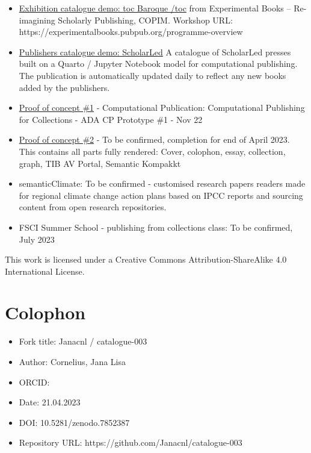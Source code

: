 \documentclass[
  letterpaper,
]{book}
\providecommand{\tightlist}{%
  \setlength{\itemsep}{0pt}\setlength{\parskip}{0pt}}\usepackage{longtable,booktabs,array}
\begin{document}
\begin{itemize}
\item
  \href{https://nfdi4culture.github.io/experimental-books-workshop/}{Exhibition
  catalogue demo: toc Baroque /toc} from Experimental Books --
  Re-imagining Scholarly Publishing, COPIM. Workshop URL:
  https://experimentalbooks.pubpub.org/programme-overview
\item
  \href{https://simonxix.github.io/scholarled_catalogue/}{Publishers
  catalogue demo: ScholarLed} A catalogue of ScholarLed presses built on
  a Quarto / Jupyter Notebook model for computational publishing. The
  publication is automatically updated daily to reflect any new books
  added by the publishers.
\item
  \href{https://nfdi4culture.github.io/cp4c/}{Proof of concept \#1} -
  Computational Publication: Computational Publishing for Collections -
  ADA CP Prototype \#1 - Nov 22
\item
  \href{https://nfdi4culture.github.io/art_catalogue_test/}{Proof of
  concept \#2} - To be confirmed, completion for end of April 2023. This
  contains all parts fully rendered: Cover, colophon, essay, collection,
  graph, TIB AV Portal, Semantic Kompakkt
\item
  semanticClimate: To be confirmed - customised research papers readers
  made for regional climate change action plans based on IPCC reports
  and sourcing content from open research repositories.
\item
  FSCI Summer School - publishing from collections class: To be
  confirmed, July 2023
\end{itemize}

This work is licensed under a Creative Commons Attribution-ShareAlike
4.0 International License.


\hypertarget{colophon}{%
\chapter{Colophon}\label{colophon}}

\begin{itemize}
\tightlist
\item
  Fork title: Janacnl / catalogue-003
\item
  Author: Cornelius, Jana Lisa
\item
  ORCID:
\item
  Date: 21.04.2023
\item
  DOI: 10.5281/zenodo.7852387
\item
  Repository URL: https://github.com/Janacnl/catalogue-003
\end{itemize}
\end{document}
